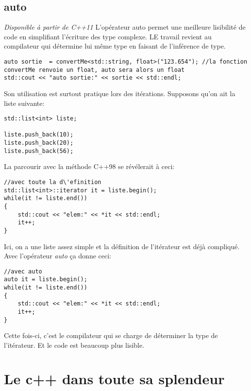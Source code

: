 \documentclass[onecolumn]{book}%
\makeatletter
\newcommand{\newdef}[1]{#1\index{#1@\textsc{#1}}}
\makeatother
\begin{document}
\section{auto}
\emph{Disponible à partir de C++11}
L'op\'erateur \newdef{auto} permet une meilleure lisibilit\'e de code en simplifiant l'\'ecriture des type complexe. LE travail revient au compilateur qui d\'etermine lui m\^eme type en faisant de l'inf\'erence de type.
\begin{framed}
\begin{lstlisting}
auto sortie  = convertMe<std::string, float>("123.654"); //la fonction convertMe renvoie un float, auto sera alors un float
std::cout << "auto sortie:" << sortie << std::endl;
\end{lstlisting}
\end{framed}
Son utilisation est surtout pratique lors des it\'erations. Supposons qu'on ait la liste suivante:
\begin{framed}
\begin{lstlisting}
std::list<int> liste;
  
liste.push_back(10);
liste.push_back(20);
liste.push_back(56);
\end{lstlisting}
\end{framed}
La parcourir avec la m\'ethode C++98 se r\'ev\'elerait à ceci:
\begin{framed}
\begin{lstlisting}
//avec toute la d\'efinition
std::list<int>::iterator it = liste.begin();
while(it != liste.end())
{
    std::cout << "elem:" << *it << std::endl;
    it++;
}
\end{lstlisting}
\end{framed}
Ici, on a une liste assez simple et la d\'efinition de l'it\'erateur est d\'ejà compliqu\'e. Avec l'op\'erateur \emph{auto} ça donne ceci:
\begin{framed}
\begin{lstlisting}
//avec auto
auto it = liste.begin();
while(it != liste.end())
{
    std::cout << "elem:" << *it << std::endl;
    it++;
}
\end{lstlisting}
\end{framed}
Cette fois-ci, c'est le compilateur qui se charge de d\'eterminer la type de l'it\'erateur. Et le code est beaucoup plus lisible.
\chapter{Le c++ dans toute sa splendeur}
\end{document}
